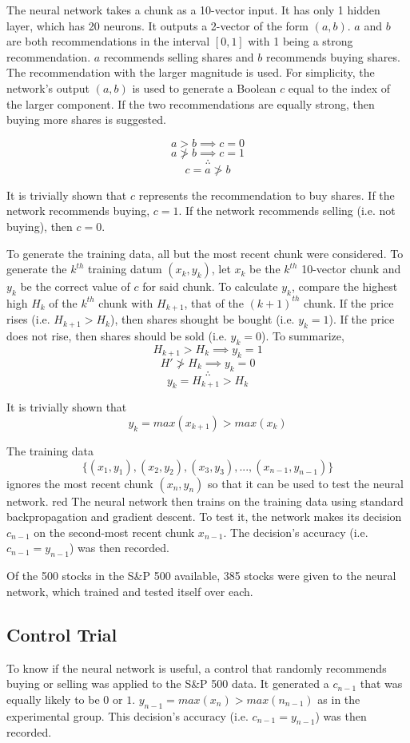 \documentclass[twocolumn]{article}
\begin{document}
The neural network takes a chunk as a 10-vector input. It has only 1 hidden layer, which has 20 neurons. It outputs a 2-vector of the form $(a, b)$. $a$ and $b$ are both recommendations in the interval $[0, 1]$ with 1 being a strong recommendation. $a$ recommends selling shares and $b$ recommends buying shares. The recommendation with the larger magnitude is used. For simplicity, the network's output $(a, b)$ is used to generate a Boolean $c$ equal to the index of the larger component. If the two recommendations are equally strong, then buying more shares is suggested.

$$a > b \implies c = 0$$
$$a \ngtr b \implies c = 1$$
$$\therefore$$
$$c = a \ngtr b$$

It is trivially shown that $c$ represents the recommendation to buy shares. If the network recommends buying, $c=1$. If the network recommends selling (i.e. not buying), then $c=0$.

To generate the training data, all but the most recent chunk were considered. To generate the $k^{th}$ training datum $(x_k, y_k)$, let $x_k$ be the $k^{th}$ 10-vector chunk and $y_k$ be the correct value of $c$ for said chunk. To calculate $y_k$, compare the highest high $H_k$ of the $k^{th}$ chunk with $H_{k+1}$, that of the $(k+1)^{th}$ chunk. If the price rises (i.e. $H_{k+1} > H_k$), then shares shought be bought (i.e. $y_k=1$). If the price does not rise, then shares should be sold (i.e. $y_k=0$). To summarize,
$$H_{k+1} > H_k \implies y_k = 1$$
$$H' \ngtr H_k \implies y_k = 0$$
$$\therefore$$
$$y_k = H_{k+1} > H_k$$

It is trivially shown that
$$y_k = max(x_{k+1}) > max(x_k)$$

The training data
$$\{(x_1, y_1), (x_2, y_2), (x_3, y_3), ..., (x_{n-1}, y_{n-1})\}$$
ignores the most recent chunk $(x_n, y_n)$ so that it can be used to test the neural network.
red
The neural network then trains on the training data using standard backpropagation and gradient descent. To test it, the network makes its decision $c_{n-1}$ on the second-most recent chunk $x_{n-1}$. The decision's accuracy (i.e. $c_{n-1} = y_{n-1}$) was then recorded.

Of the 500 stocks in the S\&P 500 available, 385 stocks were given to the neural network, which trained and tested itself over each.

\subsection{Control Trial}
To know if the neural network is useful, a control that randomly recommends buying or selling was applied to the S\&P 500 data. It generated a $c_{n-1}$ that was equally likely to be $0$ or $1$. $y_{n-1} = max(x_n) > max(n_{n-1})$ as in the experimental group. This decision's accuracy (i.e. $c_{n-1} = y_{n-1}$) was then recorded.
\end{document}
